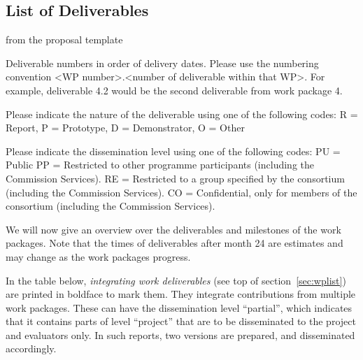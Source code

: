 \subsection{List of Deliverables}\label{sec:deliverables}

\begin{todo}{from the proposal template}
\begin{compactenum}
\item Deliverable numbers in order of delivery dates. Please use the numbering convention <WP number>.<number of deliverable within
that WP>. For example, deliverable 4.2 would be the second deliverable from work package 4.
\item Please indicate the nature of the deliverable using one of the following codes:
R = Report, P = Prototype, D = Demonstrator, O = Other
\item Please indicate the dissemination level using one of the following codes:
PU = Public
PP = Restricted to other programme participants (including the Commission Services).
RE = Restricted to a group specified by the consortium (including the Commission Services).
CO = Confidential, only for members of the consortium (including the Commission Services).
\end{compactenum}
\end{todo}
We will now give an overview over the deliverables and milestones of the work
packages. Note that the times of deliverables after month 24 are estimates and may change
as the work packages progress.

In the table below, {\emph{integrating work deliverables}} (see top of
section~\ref{sec:wplist}) are printed in boldface to mark them. They integrate
contributions from multiple work packages. These can have the
dissemination level ``partial'', which indicates that it contains parts of level
``project'' that are to be disseminated to the project and evaluators only. In such
reports, two versions are prepared, and disseminated accordingly.

{\footnotesize{}}



